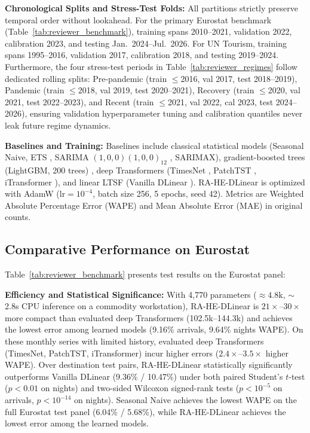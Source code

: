 \documentclass[sigconf]{acmart}
\begin{document}
\textbf{Chronological Splits and Stress-Test Folds:} All partitions strictly preserve temporal order without lookahead. For the primary Eurostat benchmark (Table~\ref{tab:reviewer_benchmark}), training spans 2010--2021, validation 2022, calibration 2023, and testing Jan.\ 2024--Jul.\ 2026. For UN Tourism, training spans 1995--2016, validation 2017, calibration 2018, and testing 2019--2024. Furthermore, the four stress-test periods in Table~\ref{tab:reviewer_regimes} follow dedicated rolling splits: Pre-pandemic (train $\le$2016, val 2017, test 2018--2019), Pandemic (train $\le$2018, val 2019, test 2020--2021), Recovery (train $\le$2020, val 2021, test 2022--2023), and Recent (train $\le$2021, val 2022, cal 2023, test 2024--2026), ensuring validation hyperparameter tuning and calibration quantiles never leak future regime dynamics.

\textbf{Baselines and Training:} Baselines include classical statistical models (Seasonal Naive, ETS \cite{athanasopoulos2011tourism}, SARIMA $(1,0,0)(1,0,0)_{12}$ \cite{song2019tourism}, SARIMAX), gradient-boosted trees (LightGBM, 200 trees) \cite{ke2017lightgbm}, deep Transformers (TimesNet \cite{wu2023timesnet}, PatchTST \cite{nie2023patchtst}, iTransformer \cite{liu2024itransformer}), and linear LTSF (Vanilla DLinear \cite{zeng2023dlinear}). RA-HE-DLinear is optimized with AdamW ($\text{lr}=10^{-4}$, batch size 256, 5 epochs, seed 42). Metrics are Weighted Absolute Percentage Error (WAPE) and Mean Absolute Error (MAE) in original counts.



\enlargethispage{20pt}
\subsection{Comparative Performance on Eurostat}
Table~\ref{tab:reviewer_benchmark} presents test results on the Eurostat panel:

\textbf{Efficiency and Statistical Significance:} With 4,770 parameters ($\approx 4.8\text{k}$, $\sim$2.8s CPU inference on a commodity workstation), RA-HE-DLinear is $21\times$--$30\times$ more compact than evaluated deep Transformers (102.5k--144.3k) and achieves the lowest error among learned models (9.16\% arrivals, 9.64\% nights WAPE). On these monthly series with limited history, evaluated deep Transformers (TimesNet, PatchTST, iTransformer) incur higher errors ($2.4\times$--$3.5\times$ higher WAPE). Over destination test pairs, RA-HE-DLinear statistically significantly outperforms Vanilla DLinear (9.36\% / 10.47\%) under both paired Student's $t$-test ($p < 0.01$ on nights) and two-sided Wilcoxon signed-rank tests ($p < 10^{-5}$ on arrivals, $p < 10^{-14}$ on nights). Seasonal Naive achieves the lowest WAPE on the full Eurostat test panel (6.04\% / 5.68\%), while RA-HE-DLinear achieves the lowest error among the learned models.
\end{document}
